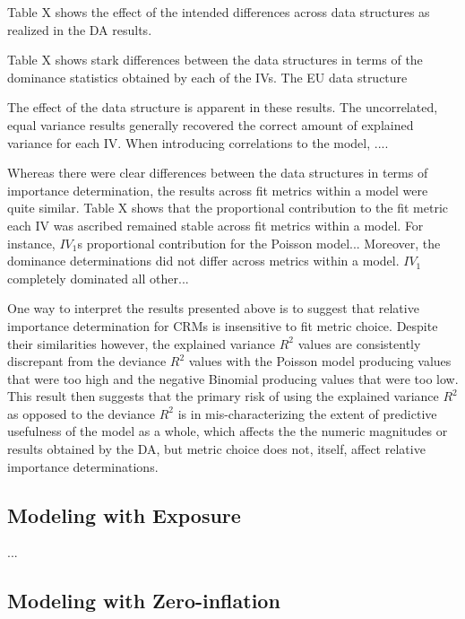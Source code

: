 \documentclass[ShortAfour,times,sageapa]{sagej}
\begin{document}
	
	
	
	Table X shows the effect of the intended differences across data structures as realized in the DA results.
	
	Table X shows stark differences between the data structures in terms of the dominance statistics obtained by each of the IVs.  The EU data structure
	
	The effect of the data structure is apparent in these results.  
	The uncorrelated, equal variance results generally recovered the correct amount of explained variance for each IV.  
	When introducing correlations to the model, ....
	
	Whereas there were clear differences between the data structures in terms of importance determination, the results across fit metrics within a model were quite similar.
	Table X shows that the proportional contribution to the fit metric each IV was ascribed remained stable across fit metrics within a model.
	For instance, $IV_1$s proportional contribution for the Poisson model...
	Moreover, the dominance determinations did not differ across metrics within a model.
	$IV_1$ completely dominated all other...
	
	One way to interpret the results presented above is to suggest that relative importance determination for CRMs is insensitive to fit metric choice. 
	Despite their similarities however, the explained variance $R^2$ values are consistently discrepant from the deviance $R^2$ values with the Poisson model producing values that were too high and the negative Binomial producing values that were too low. 
	This result then suggests that the primary risk of using the explained variance $R^2$ as opposed to the deviance $R^2$ is in mis-characterizing the extent of predictive usefulness of the model as a whole, which affects the the numeric magnitudes or results obtained by the DA, but metric choice does not, itself, affect relative importance determinations.
	
	\subsection{Modeling with Exposure}
	
	...
	
	\subsection{Modeling with Zero-inflation}
	
\end{document}
